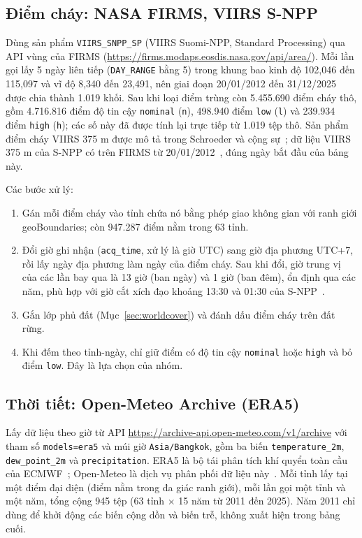 \documentclass[12pt,a4paper]{article}
\begin{document}
\subsection{Điểm cháy: NASA FIRMS, VIIRS S-NPP}

Dùng sản phẩm \texttt{VIIRS\_SNPP\_SP} (VIIRS Suomi-NPP, Standard Processing) qua API vùng của FIRMS (\url{https://firms.modaps.eosdis.nasa.gov/api/area/}). Mỗi lần gọi lấy 5 ngày liên tiếp (\texttt{DAY\_RANGE} bằng 5) trong khung bao kinh độ 102,046 đến 115,097 và vĩ độ 8,340 đến 23,491, nên giai đoạn 20/01/2012 đến 31/12/2025 được chia thành 1.019 khối. Sau khi loại điểm trùng còn 5.455.690 điểm cháy thô, gồm 4.716.816 điểm độ tin cậy \texttt{nominal} (\texttt{n}), 498.940 điểm \texttt{low} (\texttt{l}) và 239.934 điểm \texttt{high} (\texttt{h}); các số này đã được tính lại trực tiếp từ 1.019 tệp thô. Sản phẩm điểm cháy VIIRS 375 m được mô tả trong Schroeder và cộng sự~\cite{schroeder2014}; dữ liệu VIIRS 375 m của S-NPP có trên FIRMS từ 20/01/2012~\cite{arset}, đúng ngày bắt đầu của bảng này.

Các bước xử lý:
\begin{enumerate}
\item Gán mỗi điểm cháy vào tỉnh chứa nó bằng phép giao không gian với ranh giới geoBoundaries; còn 947.287 điểm nằm trong 63 tỉnh.
\item Đổi giờ ghi nhận (\texttt{acq\_time}, xử lý là giờ UTC) sang giờ địa phương UTC+7, rồi lấy ngày địa phương làm ngày của điểm cháy. Sau khi đổi, giờ trung vị của các lần bay qua là 13 giờ (ban ngày) và 1 giờ (ban đêm), ổn định qua các năm, phù hợp với giờ cắt xích đạo khoảng 13:30 và 01:30 của S-NPP~\cite{schroeder2014}.
\item Gắn lớp phủ đất (Mục~\ref{sec:worldcover}) và đánh dấu điểm cháy trên đất rừng.
\item Khi đếm theo tỉnh-ngày, chỉ giữ điểm có độ tin cậy \texttt{nominal} hoặc \texttt{high} và bỏ điểm \texttt{low}. Đây là lựa chọn của nhóm.
\end{enumerate}

\subsection{Thời tiết: Open-Meteo Archive (ERA5)}

Lấy dữ liệu theo giờ từ API \url{https://archive-api.open-meteo.com/v1/archive} với tham số \texttt{models=era5} và múi giờ \texttt{Asia/Bangkok}, gồm ba biến \texttt{temperature\_2m}, \texttt{dew\_point\_2m} và \texttt{precipitation}. ERA5 là bộ tái phân tích khí quyển toàn cầu của ECMWF~\cite{hersbach2020}; Open-Meteo là dịch vụ phân phối dữ liệu này~\cite{openmeteo}. Mỗi tỉnh lấy tại một điểm đại diện (điểm nằm trong đa giác ranh giới), mỗi lần gọi một tỉnh và một năm, tổng cộng 945 tệp (63 tỉnh $\times$ 15 năm từ 2011 đến 2025). Năm 2011 chỉ dùng để khởi động các biến cộng dồn và biến trễ, không xuất hiện trong bảng cuối.
\end{document}
